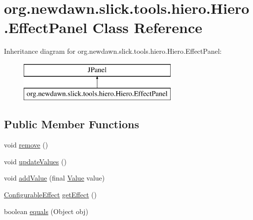 \hypertarget{classorg_1_1newdawn_1_1slick_1_1tools_1_1hiero_1_1_hiero_1_1_effect_panel}{}\section{org.\+newdawn.\+slick.\+tools.\+hiero.\+Hiero.\+Effect\+Panel Class Reference}
\label{classorg_1_1newdawn_1_1slick_1_1tools_1_1hiero_1_1_hiero_1_1_effect_panel}
Inheritance diagram for org.\+newdawn.\+slick.\+tools.\+hiero.\+Hiero.\+Effect\+Panel\+:\begin{figure}[H]
\begin{center}
\leavevmode
\includegraphics[height=2.000000cm]{classorg_1_1newdawn_1_1slick_1_1tools_1_1hiero_1_1_hiero_1_1_effect_panel}
\end{center}
\end{figure}
\subsection*{Public Member Functions}
\begin{DoxyCompactItemize}
\item 
void \mbox{\hyperlink{classorg_1_1newdawn_1_1slick_1_1tools_1_1hiero_1_1_hiero_1_1_effect_panel_a0b94209784665ad66f0ff3c9f460500b}{remove}} ()
\item 
void \mbox{\hyperlink{classorg_1_1newdawn_1_1slick_1_1tools_1_1hiero_1_1_hiero_1_1_effect_panel_afca6e77363d958d8cfae9344755c2526}{update\+Values}} ()
\item 
void \mbox{\hyperlink{classorg_1_1newdawn_1_1slick_1_1tools_1_1hiero_1_1_hiero_1_1_effect_panel_ae531b30644da40b2caa6c2259913359c}{add\+Value}} (final \mbox{\hyperlink{interfaceorg_1_1newdawn_1_1slick_1_1font_1_1effects_1_1_configurable_effect_1_1_value}{Value}} value)
\item 
\mbox{\hyperlink{interfaceorg_1_1newdawn_1_1slick_1_1font_1_1effects_1_1_configurable_effect}{Configurable\+Effect}} \mbox{\hyperlink{classorg_1_1newdawn_1_1slick_1_1tools_1_1hiero_1_1_hiero_1_1_effect_panel_a4c5d7a640d69c0e376efba917a6b337b}{get\+Effect}} ()
\item 
boolean \mbox{\hyperlink{classorg_1_1newdawn_1_1slick_1_1tools_1_1hiero_1_1_hiero_1_1_effect_panel_a97d2de161b78632fe5b5b5b9f794fa0d}{equals}} (Object obj)
\end{DoxyCompactItemize}
